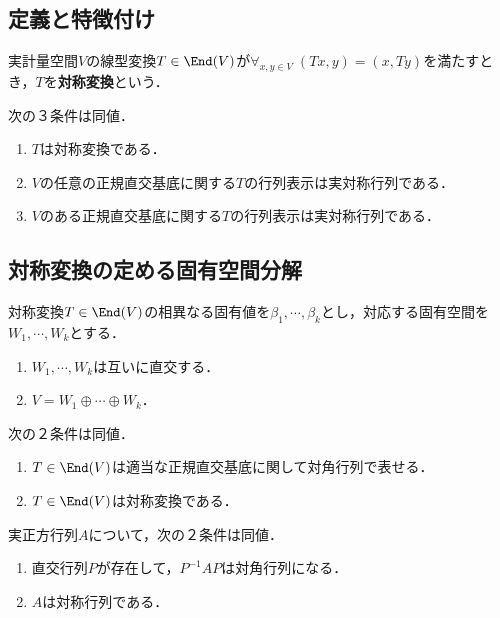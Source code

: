 \documentclass[uplatex, dvipdfmx]{jsreport}
\begin{document}
\subsection{定義と特徴付け}

\begin{definition}
    実計量空間$V$の線型変換$T\in\End(V)$が$\forall_{x,y\in V}\;(Tx,y)=(x,Ty)$を満たすとき，$T$を\textbf{対称変換}という．
\end{definition}

\begin{lemma}[特徴付け]
    次の３条件は同値．
    \begin{enumerate}
        \item $T$は対称変換である．
        \item $V$の任意の正規直交基底に関する$T$の行列表示は実対称行列である．
        \item $V$のある正規直交基底に関する$T$の行列表示は実対称行列である．
    \end{enumerate}
\end{lemma}

\subsection{対称変換の定める固有空間分解}

\begin{theorem}
    対称変換$T\in\End(V)$の相異なる固有値を$\beta_1,\cdots,\beta_k$とし，対応する固有空間を$W_1,\cdots,W_k$とする．
    \begin{enumerate}
        \item $W_1,\cdots,W_k$は互いに直交する．
        \item $V=W_1\oplus\cdots\oplus W_k$．
    \end{enumerate}
\end{theorem}

\begin{corollary}
    次の２条件は同値．
    \begin{enumerate}
        \item $T\in\End(V)$は適当な正規直交基底に関して対角行列で表せる．
        \item $T\in\End(V)$は対称変換である．
    \end{enumerate}
\end{corollary}

\begin{corollary}
    実正方行列$A$について，次の２条件は同値．
    \begin{enumerate}
        \item 直交行列$P$が存在して，$P^{-1}AP$は対角行列になる．
        \item $A$は対称行列である．
    \end{enumerate}
\end{corollary}
\end{document}
